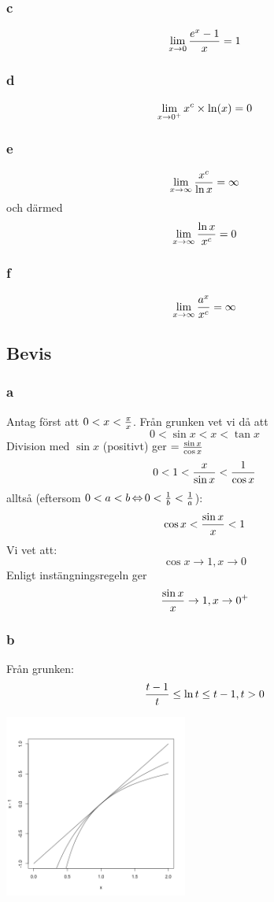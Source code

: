 \documentclass{article}
\begin{document}
\subsubsection{c}
$$\displaystyle \lim_{x \rightarrow 0} \frac{e^x - 1}{x} = 1$$
\subsubsection{d}
$$\displaystyle \lim_{x \rightarrow 0^+} x^c \times \ln(x) = 0$$
\subsubsection{e}
$$\displaystyle \lim_{x \rightarrow \infty} \frac{x^c}{\ln x} = \infty$$
och därmed
$$\displaystyle \lim_{x \rightarrow \infty} \frac{\ln x}{x^c} = 0$$
\subsubsection{f}
$$\displaystyle \lim_{x \rightarrow \infty} \frac{a^x}{x^c} = \infty$$

\subsection{Bevis}
\subsubsection{a}
Antag först att $0<x<\frac{\pi}{x}$. Från grunken vet vi då att
$$ 0 < \sin x < x < \tan x $$
Division med $\sin x$ (positivt) ger $=\frac{\sin x}{\cos x}$
$$ 0 < 1 < \frac{x}{\sin{x}} < \frac{1}{\cos{x}} $$
alltså (eftersom $0<a<b\operatorname{\Leftrightarrow} 0<\frac{1}{b} <\frac{1}{a}$):
$$ \cos x < \frac{\sin x}{x}<1 $$
Vi vet att:
$$ \cos x \to 1, x \to 0 $$
Enligt instängningsregeln ger
$$ \frac{\sin x}{x} \to 1, x\to 0^+$$

\subsubsection{b}
Från grunken:
$$ \frac{t-1}{t} \le \ln t \le t-1, t>0 $$

\includegraphics[height=60mm, width=60mm]{img/lntt.png}
\end{document}
